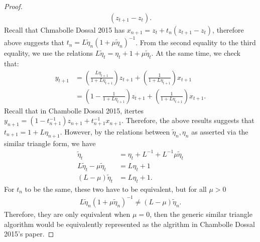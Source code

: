 \documentclass[12pt]{article}
\begin{document}
\begin{proof}
\begin{align*}
                (z_{t + 1} - z_t). 
            \end{align*}
            Recall that Chmabolle Dossal 2015 has $x_{n + 1} = z_t + t_n(z_{t + 1} - z_t)$, 
            therefore above suggests that $t_n = L \tilde \eta_{n}(1 + \mu \tilde \eta_{n})^{-1}$. 
            From the second equality to the third equality, we use the relations $L\tilde \eta_{t} = \eta_t + 1 + \mu\tilde \eta_{t}$.
            At the same time, we check that: 
            \begin{align*}
                y_{t + 1} &= \left(
                    \frac{L\eta_{t + 1}}{1 + L \eta_{t + 1}}
                \right)z_{t + 1} + 
                \left(
                    \frac{1}{1 + L \eta_{t + 1}}
                \right) x_{t + 1}
                \\
                &= 
                \left(
                    1 - \frac{1}{1 + L\eta_{t + 1}}
                \right)z_{t + 1} + 
                \left(
                    \frac{1}{1 + L \eta_{t + 1}}
                \right)x_{t + 1}. 
            \end{align*}
            Recall that in Chambolle Dossal 2015, itertes $y_{n + 1} = (1 - t_{n + 1}^{-1})z_{n + 1} + t_{n + 1}^{-1} x_{n + 1}$. 
            Therefore, the above results suggests that $t_{n + 1} = 1 + L\eta_{n + 1}$. 
            However, by the relations between $\tilde \eta_n, \eta_n$ as asserted via the similar triangle form, we have 
            \begin{align*}
                \tilde \eta_t &= \eta_t + L^{-1} + L^{-1}\mu \tilde \eta_t
                \\
                L\tilde \eta_t - \mu \tilde \eta_t 
                &= 
                L \eta_t + 1
                \\
                (L - \mu)\tilde \eta_t &= L\eta_t + 1. 
            \end{align*}
            For $t_n$ to be the same, these two have to be equivalent, but for all $\mu > 0$
            \begin{align*}
                L\tilde \eta_n (1 + \mu \tilde \eta_n)^{-1} \not = 
                (L - \mu )\tilde \eta_n. 
            \end{align*}
            Therefore, they are only equivalent when $\mu = 0$, then the generic similar triangle algorithm would be equivalently represented as the algrithm in Chambolle Dossal 2015's paper. 
        \end{proof}
\end{document}
